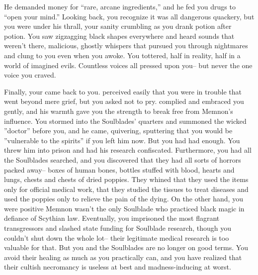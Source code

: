 \documentclass[char]{Kos}
\begin{document}
He demanded money for ``rare, arcane ingredients,'' and he fed you drugs to ``open your mind.'' Looking back, you recognize it was all dangerous quackery, but you were under his thrall, your sanity crumbling as you drank potion after potion. You saw zigzagging black shapes everywhere and heard sounds that weren't there, malicious, ghostly whispers that pursued you through nightmares and clung to you even when you awoke. You tottered, half in reality, half in a world of imagined evils. Countless voices all pressed upon you-- but never the one voice you craved.

Finally, your \cScythiaKing{\spouse} came back to you. \cScythiaKing{\They} perceived easily that you were in trouble that went beyond mere grief, but you asked \cScythiaKing{\them} not to pry. \cScythiaKing{\They} complied and embraced you gently, and his warmth gave you the strength to break free from Memnon's influence. You stormed into the Soulblades' quarters and summoned the wicked ''doctor'' before you, and he came, quivering, sputtering that you would be ''vulnerable to the spirits'' if you left him now. But you had had enough. You threw him into prison and had his research confiscated. Furthermore, you had all the Soulblades searched, and you discovered that they had all sorts of horrors packed away-- boxes of human bones, bottles stuffed with blood, hearts and lungs, chests and chests of dried poppies. They whined that they used the items only for official medical work, that they studied the tissues to treat diseases and used the poppies only to relieve the pain of the dying. On the other hand, you were positive Memnon wasn't the only Soulblade who practiced black magic in defiance of Scythian law. Eventually, you imprisoned the most flagrant transgressors and slashed state funding for Soulblade research, though you couldn't shut down the whole lot-- their legitimate medical research is too valuable for that. But you and the Soulblades are no longer on good terms. You avoid their healing as much as you practically can, and you have realized that their cultish necromancy is useless at best and madness-inducing at worst.
\end{document}
